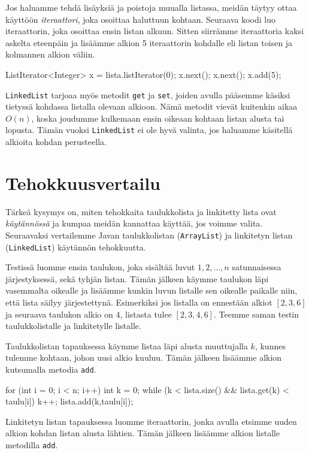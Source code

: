 Jos haluamme tehdä lisäyksiä ja poistoja muualla listassa,
meidän täytyy ottaa käyttöön \emph{iteraattori}, joka osoittaa haluttuun kohtaan.
Seuraava koodi luo iteraattorin, joka osoittaa ensin listan alkuun.
Sitten siirrämme iteraattoria kaksi askelta eteenpäin ja
lisäämme alkion 5 iteraattorin kohdalle eli listan
toisen ja kolmannen alkion väliin.

\begin{code}
ListIterator<Integer> x = lista.listIterator(0);
x.next();
x.next();
x.add(5);
\end{code}

\texttt{LinkedList} tarjoaa myös metodit
\texttt{get} ja \texttt{set}, joiden avulla
pääsemme käsiksi tietyssä kohdassa listalla olevaan alkioon.
Nämä metodit vievät kuitenkin aikaa $O(n)$,
koska joudumme kulkemaan ensin oikeaan kohtaan listan
alusta tai lopusta.
Tämän vuoksi \texttt{LinkedList} ei ole hyvä valinta,
jos haluamme käsitellä alkioita kohdan perusteella.

\section{Tehokkuusvertailu}

Tärkeä kysymys on, miten tehokkaita taulukkolista ja
linkitetty lista ovat \emph{käytännössä} ja kumpaa meidän
kannattaa käyttää, jos voimme valita.
Seuraavaksi vertailemme Javan taulukkolistan
(\texttt{ArrayList}) ja linkitetyn listan (\texttt{LinkedList})
käytännön tehokkuutta.

Testissä luomme ensin taulukon, joka sisältää luvut $1,2,\dots,n$
satunnaisessa järjestyksessä, sekä tyhjän listan.
Tämän jälkeen käymme taulukon läpi vasemmalta oikealle
ja lisäämme kunkin luvun listalle
sen oikealle paikalle niin, että lista säilyy järjestettynä.
Esimerkiksi jos listalla on ennestään alkiot $[2,3,6]$ ja seuraava
taulukon alkio on $4$, listasta tulee $[2,3,4,6]$.
Teemme saman testin taulukkolistalle ja linkitetylle listalle.

Taulukkolistan tapauksessa käymme listaa läpi alusta
muuttujalla $k$, kunnes tulemme kohtaan, johon uusi alkio kuuluu.
Tämän jälkeen lisäämme alkion kutsumalla metodia \texttt{add}.

\begin{code}
for (int i = 0; i < n; i++) {
    int k = 0;
    while (k < lista.size() && lista.get(k) < taulu[i]) {
        k++;
    }
    lista.add(k,taulu[i]);
}
\end{code}

Linkitetyn listan tapauksessa luomme iteraattorin,
jonka avulla etsimme uuden alkion kohdan listan alusta lähtien.
Tämän jälkeen lisäämme alkion listalle metodilla \texttt{add}.

